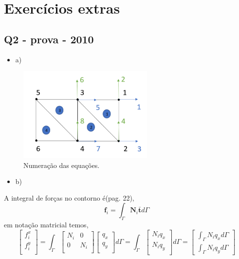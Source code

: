 \section{Exercícios extras}


\subsection{Q2 - prova - 2010}

\begin{itemize}
	\item a)	
\end{itemize}

%
\begin{figure}[H]
	\includegraphics[width=0.6\textwidth,center]{fig/q2_prova2010.PNG}
	\caption{Numeração das equações.} 
	\label{provas:Numeracao_eq}
\end{figure}
%
\begin{itemize}
	\item b)	
\end{itemize}
%
A integral de forças no contorno é(pag. 22),
%
\begin{equation}
	\mathbf{f}_i = \int_{\Gamma} \mathbf{N}_i \mathbf{\bar t} d\Gamma
\end{equation}
%
em notação matricial temos,
%
\begin{equation}
	\begin{bmatrix}
		f^x_i\\
		f^y_i\\
	\end{bmatrix}
	=
	\int_{\Gamma}
	\begin{bmatrix}
		N_i&0\\
		0&N_i\\
	\end{bmatrix}
	\begin{bmatrix}
		q_x\\
		q_y\\
	\end{bmatrix}
	d\Gamma
	=
	\int_{\Gamma}
	\begin{bmatrix}
		N_i q_x\\
		N_i q_y\\
	\end{bmatrix}
	d\Gamma
	=
	\begin{bmatrix}
		\int_{\Gamma} N_i q_x d\Gamma\\
		\int_{\Gamma} N_i q_y d\Gamma
	\end{bmatrix}
\end{equation}

